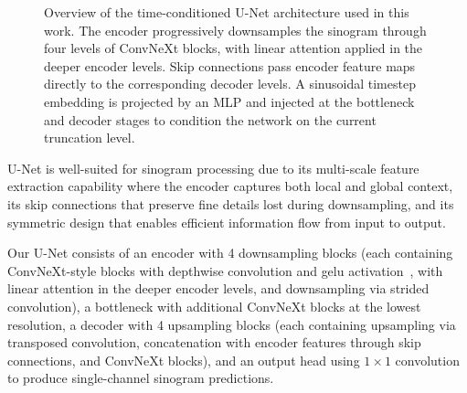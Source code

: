 \begin{figure}[htbp]
{
}
\caption{Overview of the time-conditioned U-Net architecture used in this work. The encoder progressively downsamples the sinogram through four levels of ConvNeXt blocks, with linear attention applied in the deeper encoder levels. Skip connections pass encoder feature maps directly to the corresponding decoder levels. A sinusoidal timestep embedding is projected by an MLP and injected at the bottleneck and decoder stages to condition the network on the current truncation level.}
\label{fig:method_unet_architecture}
\end{figure}

U-Net is well-suited for sinogram processing due to its multi-scale feature extraction capability where the encoder captures both local and global context, its skip connections that preserve fine details lost during downsampling, and its symmetric design that enables efficient information flow from input to output.

Our U-Net consists of an encoder with 4 downsampling blocks (each containing ConvNeXt-style blocks with depthwise convolution and \gls{gelu} activation~\cite{liu2022convnet}, with linear attention in the deeper encoder levels, and downsampling via strided convolution), a bottleneck with additional ConvNeXt blocks at the lowest resolution, a decoder with 4 upsampling blocks (each containing upsampling via transposed convolution, concatenation with encoder features through skip connections, and ConvNeXt blocks), and an output head using $1 \times 1$ convolution to produce single-channel sinogram predictions.

